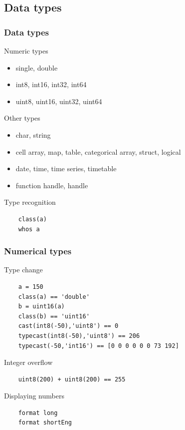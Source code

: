 \documentclass{beamer}
\begin{document}
\subsection{Data types}

\begin{frame}[fragile]
\frametitle{Data types}
 
  \begin{block}{Numeric types}
    \begin{itemize}
      \item single, double
      \item int8, int16, int32, int64
      \item uint8, uint16, uint32, uint64
    \end{itemize}
  \end{block}
  
  \pause
  
  \begin{block}{Other types}
  \begin{itemize}
      \item char, string
      \item cell array, map, table, categorical array, struct, logical
      \item date, time, time series, timetable
      \item function handle, handle
  \end{itemize}
  \end{block}
  
  \pause
  
  \begin{block}{Type recognition}
  \begin{verbatim}
    class(a)
    whos a \end{verbatim}
  \end{block}
\end{frame}
  
\begin{frame}[fragile]
\frametitle{Numerical types}   
  
  \begin{block}{Type change}
    \begin{verbatim}
    a = 150
    class(a) == 'double'
    b = uint16(a)
    class(b) == 'uint16'
    cast(int8(-50),'uint8') == 0
    typecast(int8(-50),'uint8') == 206
    typecast(-50,'int16') == [0 0 0 0 0 0 73 192]\end{verbatim}    
  \end{block}  
  
  \pause
  
  \begin{alertblock}{Integer overflow}
    \begin{verbatim}
    uint8(200) + uint8(200) == 255 \end{verbatim}
  \end{alertblock}
  
  \pause
  
  \begin{block}{Displaying numbers}
    \begin{verbatim}
    format long
    format shortEng
\end{verbatim}    
  \end{block}  
\end{frame}
\end{document}
